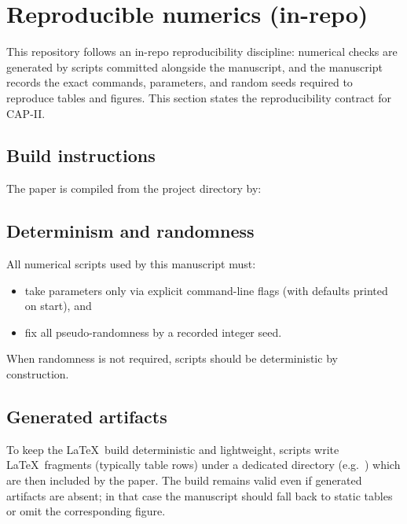 \section{Reproducible numerics (in-repo)}
\label{sec:reproducible_numerics}

This repository follows an in-repo reproducibility discipline: numerical checks are generated by scripts committed alongside the manuscript, and the manuscript records the exact commands, parameters, and random seeds required to reproduce tables and figures.
This section states the reproducibility contract for CAP-II.

\subsection{Build instructions}
\label{subsec:build_instructions}

The paper is compiled from the project directory by:
\begin{center}
\end{center}

\subsection{Determinism and randomness}
\label{subsec:determinism_randomness}

All numerical scripts used by this manuscript must:
\begin{itemize}
  \item take parameters only via explicit command-line flags (with defaults printed on start), and
  \item fix all pseudo-randomness by a recorded integer seed.
\end{itemize}
When randomness is not required, scripts should be deterministic by construction.

\subsection{Generated artifacts}
\label{subsec:generated_artifacts}

To keep the \LaTeX\ build deterministic and lightweight, scripts write \LaTeX\ fragments (typically table rows) under a dedicated directory (e.g.\ ) which are then included by the paper.
The build remains valid even if generated artifacts are absent; in that case the manuscript should fall back to static tables or omit the corresponding figure.

